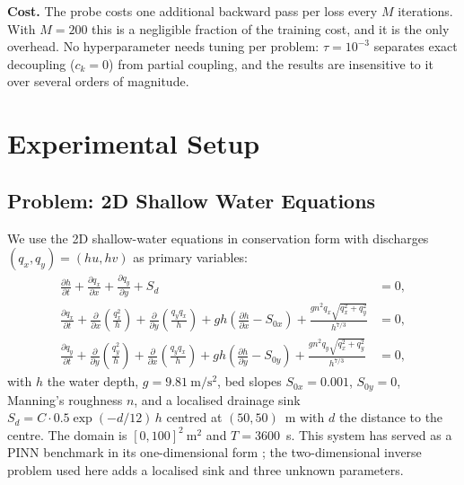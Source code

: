 \documentclass[a4paper,fleqn]{cas-sc}
\begin{document}
\textbf{Cost.} The probe costs one additional backward pass per loss every $M$
iterations. With $M = 200$ this is a negligible fraction of the training cost,
and it is the only overhead. No hyperparameter needs tuning per problem: $\tau =
10^{-3}$ separates exact decoupling ($c_k = 0$) from partial coupling, and the
results are insensitive to it over several orders of magnitude.

\section{Experimental Setup}
\label{sec:setup}

\subsection{Problem: 2D Shallow Water Equations}

We use the 2D shallow-water equations in conservation form with discharges
$(q_x,q_y) = (hu,hv)$ as primary variables:
\begin{align}
\frac{\partial h}{\partial t} + \frac{\partial q_x}{\partial x} +
\frac{\partial q_y}{\partial y} + S_d &= 0, \label{eq:swe_cont} \\
\frac{\partial q_x}{\partial t} + \frac{\partial}{\partial x}\!\left(\frac{q_x^2}{h}\right)
+ \frac{\partial}{\partial y}\!\left(\frac{q_y q_x}{h}\right)
+ gh\left(\frac{\partial h}{\partial x} - S_{0x}\right)
+ \frac{g n^2 q_x \sqrt{q_x^2+q_y^2}}{h^{7/3}} &= 0, \label{eq:swe_xmom} \\
\frac{\partial q_y}{\partial t} + \frac{\partial}{\partial y}\!\left(\frac{q_y^2}{h}\right)
+ \frac{\partial}{\partial x}\!\left(\frac{q_y q_x}{h}\right)
+ gh\left(\frac{\partial h}{\partial y} - S_{0y}\right)
+ \frac{g n^2 q_y \sqrt{q_x^2+q_y^2}}{h^{7/3}} &= 0, \label{eq:swe_ymom}
\end{align}
with $h$ the water depth, $g = 9.81\ \mathrm{m/s^2}$, bed slopes $S_{0x} =
0.001$, $S_{0y} = 0$, Manning's roughness $n$, and a localised drainage sink
$S_d = C \cdot 0.5 \exp(-d/12)\, h$ centred at $(50,50)$~m with $d$ the
distance to the centre. The domain is $[0,100]^2\ \mathrm{m^2}$ and $T =
3600$~s. This system has served as a PINN benchmark in its one-dimensional form
\citep{he2023physics}; the two-dimensional inverse problem used here adds a
localised sink and three unknown parameters.
\end{document}
